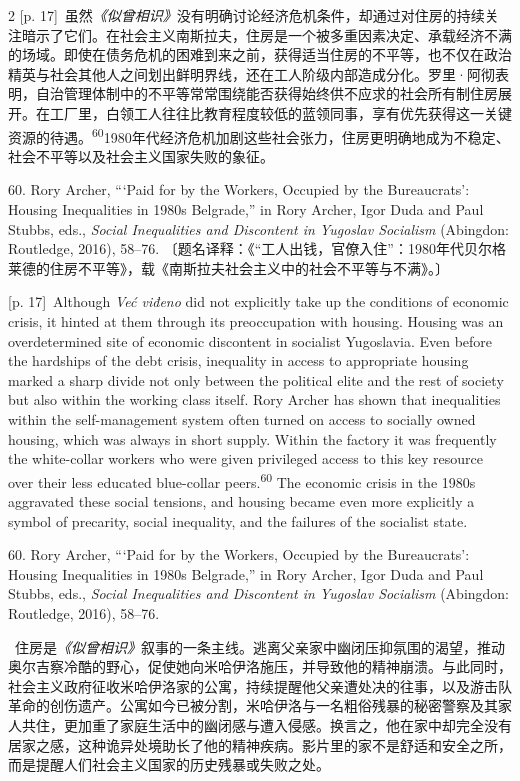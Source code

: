 \documentclass[10pt,a4paper]{article}
\begin{document}
\begin{paracol}{2}
{\scriptsize\color{gray} [p. 17]}\ 虽然\textit{《似曾相识》}没有明确讨论经济危机条件，却通过对住房的持续关注暗示了它们。在社会主义南斯拉夫，住房是一个被多重因素决定、承载经济不满的场域。即使在债务危机的困难到来之前，获得适当住房的不平等，也不仅在政治精英与社会其他人之间划出鲜明界线，还在工人阶级内部造成分化。罗里·阿彻表明，自治管理体制中的不平等常常围绕能否获得始终供不应求的社会所有制住房展开。在工厂里，白领工人往往比教育程度较低的蓝领同事，享有优先获得这一关键资源的待\mbox{遇。\textsuperscript{60}}1980年代经济危机加剧这些社会张力，住房更明确地成为不稳定、社会不平等以及社会主义国家失败的象征。\par{\small 60. Rory Archer, “‘Paid for by the Workers, Occupied by the Bureaucrats’: Housing Inequalities in 1980s Belgrade,” in Rory Archer, Igor Duda and Paul Stubbs, eds., \textit{Social Inequalities and Discontent in Yugoslav Socialism} (Abingdon: Routledge, 2016), 58–76. 〔题名译释：《“工人出钱，官僚入住”：1980年代贝尔格莱德的住房不平等》，载《南斯拉夫社会主义中的社会不平等与不满》。〕\par}
\switchcolumn
{\scriptsize\color{gray} [p. 17]}\ Although \textit{Već viđeno} did not explicitly take up the conditions of economic crisis, it hinted at them through its preoccupation with housing. Housing was an overdetermined site of economic discontent in socialist Yugoslavia. Even before the hardships of the debt crisis, inequality in access to appropriate housing marked a sharp divide not only between the political elite and the rest of society but also within the working class itself. Rory Archer has shown that inequalities within the self-management system often turned on access to socially owned housing, which was always in short supply. Within the factory it was frequently the white-collar workers who were given privileged access to this key resource over their less educated blue-collar peers.\nobreak\textsuperscript{60} The economic crisis in the 1980s aggravated these social tensions, and housing became even more explicitly a symbol of precarity, social inequality, and the failures of the socialist state.\par{\small 60. Rory Archer, “‘Paid for by the Workers, Occupied by the Bureaucrats’: Housing Inequalities in 1980s Belgrade,” in Rory Archer, Igor Duda and Paul Stubbs, eds., \textit{Social Inequalities and Discontent in Yugoslav Socialism} (Abingdon: Routledge, 2016), 58–76.\par}
\switchcolumn*
{\scriptsize\color{gray} [p. 18]}\ 住房是\textit{《似曾相识》}叙事的一条主线。逃离父亲家中幽闭压抑氛围的渴望，推动奥尔吉察冷酷的野心，促使她向米哈伊洛施压，并导致他的精神崩溃。与此同时，社会主义政府征收米哈伊洛家的公寓，持续提醒他父亲遭处决的往事，以及游击队革命的创伤遗产。公寓如今已被分割，米哈伊洛与一名粗俗残暴的秘密警察及其家人共住，更加重了家庭生活中的幽闭感与遭入侵感。换言之，他在家中却完全没有居家之感，这种诡异处境助长了他的精神疾病。影片里的家不是舒适和安全之所，而是提醒人们社会主义国家的历史残暴或失败之处。\par

\end{paracol}
\end{document}
